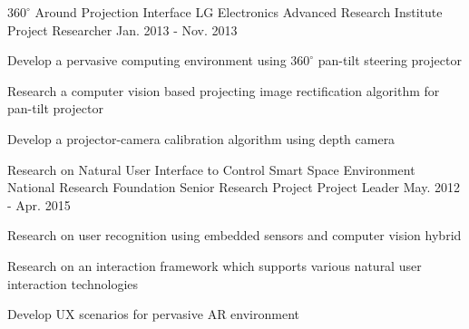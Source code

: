 \begin{cventries}
  \cventry
    {$360^{\circ}$ Around Projection Interface} %
    {LG Electronics Advanced Research Institute Project} %
    {Researcher} %
    {Jan. 2013 - Nov. 2013} %
    {
      \begin{cvitems} %
        \item {Develop a pervasive computing environment using $360^{\circ}$ pan-tilt steering projector}
        \item {Research a computer vision based projecting image rectification algorithm for pan-tilt projector}
        \item {Develop a projector-camera calibration algorithm using depth camera}
      \end{cvitems} 
    }

  \cventry
    {Research on Natural User Interface to Control Smart Space Environment} %
    {National Research Foundation Senior Research Project} %
    {Project Leader} %
    {May. 2012 - Apr. 2015} %
    {
      \begin{cvitems} %
        \item {Research on user recognition using embedded sensors and computer vision hybrid}
        \item {Research on an interaction framework which supports various natural user interaction technologies}
        \item {Develop UX scenarios for pervasive AR environment}
      \end{cvitems}
    }


\end{cventries}
